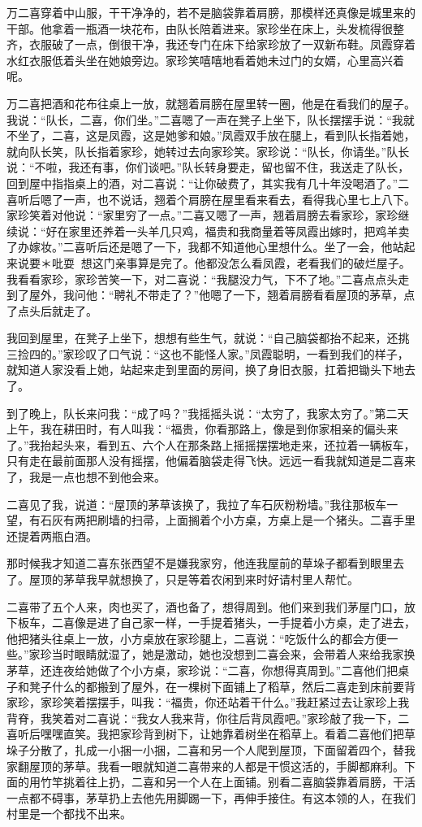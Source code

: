 \documentclass[12pt,UTF8]{ctexbook}
\begin{document}
万二喜穿着中山服，干干净净的，若不是脑袋靠着肩膀，那模样还真像是城里来的干部。他拿着一瓶酒一块花布，由队长陪着进来。家珍坐在床上，头发梳得很整齐，衣服破了一点，倒很干净，我还专门在床下给家珍放了一双新布鞋。凤霞穿着水红衣服低着头坐在她娘旁边。家珍笑嘻嘻地看着她未过门的女婿，心里高兴着呢。

万二喜把酒和花布往桌上一放，就翘着肩膀在屋里转一圈，他是在看我们的屋子。我说：“队长，二喜，你们坐。”二喜嗯了一声在凳子上坐下，队长摆摆手说：“我就不坐了，二喜，这是凤霞，这是她爹和娘。”凤霞双手放在腿上，看到队长指着她，就向队长笑，队长指着家珍，她转过去向家珍笑。家珍说：“队长，你请坐。”队长说：“不啦，我还有事，你们谈吧。”队长转身要走，留也留不住，我送走了队长，回到屋中指指桌上的酒，对二喜说：“让你破费了，其实我有几十年没喝酒了。”二喜听后嗯了一声，也不说话，翘着个肩膀在屋里看来看去，看得我心里七上八下。家珍笑着对他说：“家里穷了一点。”二喜又嗯了一声，翘着肩膀去看家珍，家珍继续说：“好在家里还养着一头羊几只鸡，福贵和我商量着等凤霞出嫁时，把鸡羊卖了办嫁妆。”二喜听后还是嗯了一下，我都不知道他心里想什么。坐了一会，他站起来说要＊吡耍＊想这门亲事算是完了。他都没怎么看凤霞，老看我们的破烂屋子。我看看家珍，家珍苦笑一下，对二喜说：“我腿没力气，下不了地。”二喜点点头走到了屋外，我问他：“聘礼不带走了？”他嗯了一下，翘着肩膀看看屋顶的茅草，点了点头后就走了。

我回到屋里，在凳子上坐下，想想有些生气，就说：“自己脑袋都抬不起来，还挑三捡四的。”家珍叹了口气说：“这也不能怪人家。”凤霞聪明，一看到我们的样子，就知道人家没看上她，站起来走到里面的房间，换了身旧衣服，扛着把锄头下地去了。

到了晚上，队长来问我：“成了吗？”我摇摇头说：“太穷了，我家太穷了。”第二天上午，我在耕田时，有人叫我：“福贵，你看那路上，像是到你家相亲的偏头来了。”我抬起头来，看到五、六个人在那条路上摇摇摆摆地走来，还拉着一辆板车，只有走在最前面那人没有摇摆，他偏着脑袋走得飞快。远远一看我就知道是二喜来了，我是一点也想不到他会来。

二喜见了我，说道：“屋顶的茅草该换了，我拉了车石灰粉粉墙。”我往那板车一望，有石灰有两把刷墙的扫帚，上面搁着个小方桌，方桌上是一个猪头。二喜手里还提着两瓶白酒。

那时候我才知道二喜东张西望不是嫌我家穷，他连我屋前的草垛子都看到眼里去了。屋顶的茅草我早就想换了，只是等着农闲到来时好请村里人帮忙。

二喜带了五个人来，肉也买了，酒也备了，想得周到。他们来到我们茅屋门口，放下板车，二喜像是进了自己家一样，一手提着猪头，一手提着小方桌，走了进去，他把猪头往桌上一放，小方桌放在家珍腿上，二喜说：“吃饭什么的都会方便一些。”家珍当时眼睛就湿了，她是激动，她也没想到二喜会来，会带着人来给我家换茅草，还连夜给她做了个小方桌，家珍说：“二喜，你想得真周到。”二喜他们把桌子和凳子什么的都搬到了屋外，在一棵树下面铺上了稻草，然后二喜走到床前要背家珍，家珍笑着摆摆手，叫我：“福贵，你还站着干什么。”我赶紧过去让家珍上我背脊，我笑着对二喜说：“我女人我来背，你往后背凤霞吧。”家珍敲了我一下，二喜听后嘿嘿直笑。我把家珍背到树下，让她靠着树坐在稻草上。看着二喜他们把草垛子分散了，扎成一小捆一小捆，二喜和另一个人爬到屋顶，下面留着四个，替我家翻屋顶的茅草。我看一眼就知道二喜带来的人都是干惯这活的，手脚都麻利。下面的用竹竿挑着往上扔，二喜和另一个人在上面铺。别看二喜脑袋靠着肩膀，干活一点都不碍事，茅草扔上去他先用脚踢一下，再伸手接住。有这本领的人，在我们村里是一个都找不出来。
\end{document}
